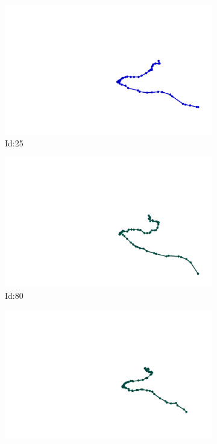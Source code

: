 \documentclass[12pt,twoside]{report}
\begin{document}
\begin{figure}
\centering
\begin{subfigure}[b]{0.20\textwidth}
\centering
\includegraphics[width=\textwidth]{../../trajectories/25.png}
\caption{Id:25}
\end{subfigure}
\begin{subfigure}[b]{0.20\textwidth}
\centering
\includegraphics[width=\textwidth]{../../trajectories/80.png}
\caption{Id:80}
\end{subfigure}
\begin{subfigure}[b]{0.20\textwidth}
\centering
\includegraphics[width=\textwidth]{../../trajectories/206.png}

\end{subfigure}
\end{figure}
\end{document}
